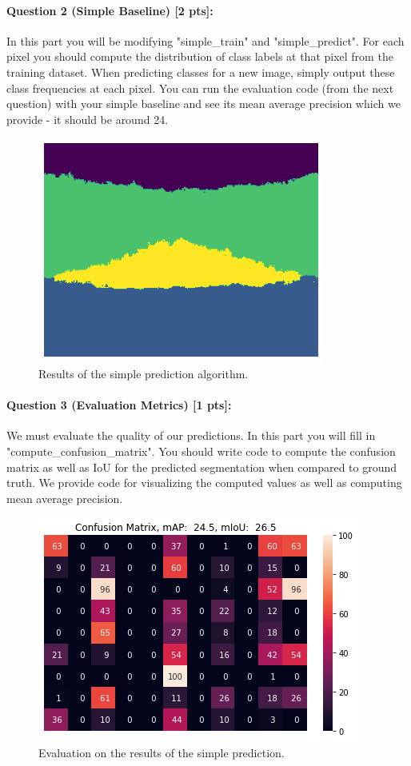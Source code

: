 \documentclass[11pt]{article}
\begin{document}
\paragraph{Question 2 (Simple Baseline) [2 pts]:} 
In this part you will be modifying "simple\_train" and "simple\_predict". For each pixel you should compute the distribution of class labels at that pixel from the training dataset. When predicting classes for a new image, simply output these class frequencies at each pixel. You can run the evaluation code (from the next question) with your simple baseline and see its mean average precision which we provide - it should be around 24.

\begin{figure}[h]
    \centering
    \includegraphics[width=0.5\linewidth]{simple_predict.png}
    \caption{Results of the simple prediction algorithm.}
    \label{fig:simple-predict}
\end{figure}

\paragraph{Question 3 (Evaluation Metrics) [1 pts]:}  
We must evaluate the quality of our predictions. In this part you will fill in "compute\_confusion\_matrix". You should write code to compute the confusion matrix as well as IoU for the predicted segmentation when compared to ground truth. We provide code for visualizing the computed values as well as computing mean average precision.

\begin{figure}[h]
    \centering
    \includegraphics[width=0.5\linewidth]{eval_simple_predict.png}
    \caption{Evaluation on the results of the simple prediction.}
    \label{fig:eval-simple-predict}
\end{figure}
\end{document}
